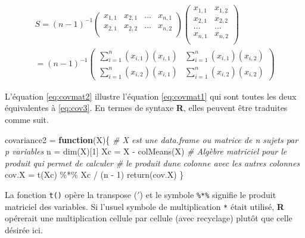 \documentclass[
]{book}
\newenvironment{Shaded}{}{}
\newcommand{\CommentTok}[1]{\textit{#1}}
\newcommand{\ControlFlowTok}[1]{\textbf{#1}}
\newcommand{\DecValTok}[1]{#1}
\newcommand{\FunctionTok}[1]{#1}
\newcommand{\NormalTok}[1]{#1}
\newcommand{\OtherTok}[1]{#1}
\newcommand{\SpecialCharTok}[1]{#1}
\begin{document}
\begin{equation}
\begin{aligned}
S = (n-1)^{-1}
\left(\begin{array}{cccc} 
x_{1,1} & x_{2,1} & ...&x_{n,1}\\
x_{2,1} & x_{2,2} & ...&x_{n,2}\\
\end{array}\right) 
\left(\begin{array}{cc} 
x_{1,1} & x_{1,2} \\
x_{2,1} & x_{2,2}\\
... & ...  \\
x_{n,1} & x_{n,2} \\
\end{array}\right) \\
= (n-1)^{-1}
\left(\begin{array}{cc}
\sum_{i=1}^n(x_{i,1})(x_{i,1}) & \sum_{i=1}^n(x_{i,1})(x_{i,2})\\
\sum_{i=1}^n(x_{i,2})(x_{i,1}) & \sum_{i=1}^n(x_{i,2})(x_{i,2})
\end{array}\right)
\label{eq:covmat2}
\end{aligned}
\end{equation}

L'équation \eqref{eq:covmat2} illustre l'équation \eqref{eq:covmat1} qui sont toutes les deux équivalentes à \eqref{eq:cov3}. En termes de syntaxe \textbf{R}, elles peuvent être traduites comme suit.

\begin{Shaded}
\begin{Highlighting}[]
\NormalTok{covariance2 }\OtherTok{=} \ControlFlowTok{function}\NormalTok{(X)\{}
  \CommentTok{\# X est une data.frame ou matrice de n sujets par p variables}
\NormalTok{  n }\OtherTok{=} \FunctionTok{dim}\NormalTok{(X)[}\DecValTok{1}\NormalTok{]}
\NormalTok{  Xc }\OtherTok{=}\NormalTok{ X }\SpecialCharTok{{-}} \FunctionTok{colMeans}\NormalTok{(X)}
  \CommentTok{\# Algèbre matriciel pour le produit qui permet de calculer}
  \CommentTok{\# le produit d\textquotesingle{}une colonne avec les autres colonnes}
\NormalTok{  cov.X }\OtherTok{=} \FunctionTok{t}\NormalTok{(Xc) }\SpecialCharTok{\%*\%}\NormalTok{ Xc }\SpecialCharTok{/}\NormalTok{ (n }\SpecialCharTok{{-}} \DecValTok{1}\NormalTok{)}
  \FunctionTok{return}\NormalTok{(cov.X)}
\NormalTok{\}}
\end{Highlighting}
\end{Shaded}

La fonction \texttt{t()} opère la transpose (\(\prime\)) et le symbole \texttt{\%*\%} signifie le produit matriciel des variables. Si l'usuel symbole de multiplication \texttt{*} était utilisé, \textbf{R} opérerait une multiplication cellule par cellule (avec recyclage) plutôt que celle désirée ici.
\end{document}

